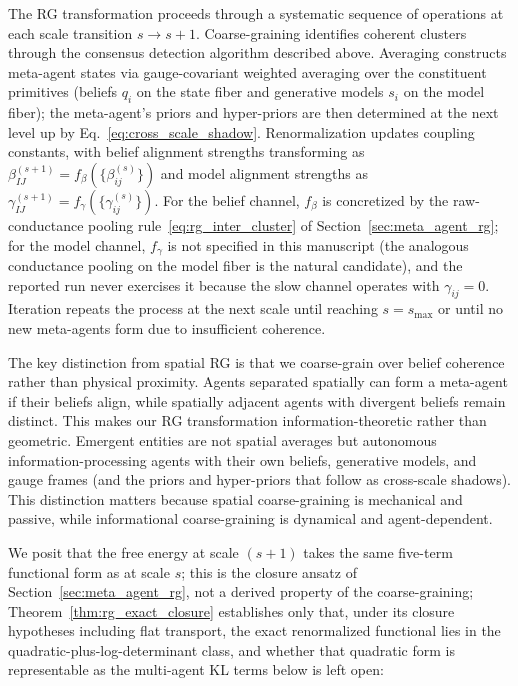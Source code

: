 \documentclass[11pt]{article}
\begin{document}
The RG transformation proceeds through a systematic sequence of operations at each scale transition $s \to s+1$. Coarse-graining identifies coherent clusters through the consensus detection algorithm described above. Averaging constructs meta-agent states via gauge-covariant weighted averaging over the constituent primitives (beliefs $q_i$ on the state fiber and generative models $s_i$ on the model fiber); the meta-agent's priors and hyper-priors are then determined at the next level up by Eq.~\eqref{eq:cross_scale_shadow}. Renormalization updates coupling constants, with belief alignment strengths transforming as $\beta_{IJ}^{(s+1)} = f_\beta(\{\beta_{ij}^{(s)}\})$ and model alignment strengths as $\gamma_{IJ}^{(s+1)} = f_\gamma(\{\gamma_{ij}^{(s)}\})$. For the belief channel, $f_\beta$ is concretized by the raw-conductance pooling rule~\eqref{eq:rg_inter_cluster} of Section~\ref{sec:meta_agent_rg}; for the model channel, $f_\gamma$ is not specified in this manuscript (the analogous conductance pooling on the model fiber is the natural candidate), and the reported run never exercises it because the slow channel operates with $\gamma_{ij} = 0$. Iteration repeats the process at the next scale until reaching $s = s_{\max}$ or until no new meta-agents form due to insufficient coherence.

The key distinction from spatial RG is that we coarse-grain over belief coherence rather than physical proximity. Agents separated spatially can form a meta-agent if their beliefs align, while spatially adjacent agents with divergent beliefs remain distinct. This makes our RG transformation information-theoretic rather than geometric. Emergent entities are not spatial averages but autonomous information-processing agents with their own beliefs, generative models, and gauge frames (and the priors and hyper-priors that follow as cross-scale shadows). This distinction matters because spatial coarse-graining is mechanical and passive, while informational coarse-graining is dynamical and agent-dependent.

We posit that the free energy at scale $(s+1)$ takes the same five-term functional form as at scale $s$; this is the closure ansatz of Section~\ref{sec:meta_agent_rg}, not a derived property of the coarse-graining; Theorem~\ref{thm:rg_exact_closure} establishes only that, under its closure hypotheses including flat transport, the exact renormalized functional lies in the quadratic-plus-log-determinant class, and whether that quadratic form is representable as the multi-agent KL terms below is left open:
\end{document}

